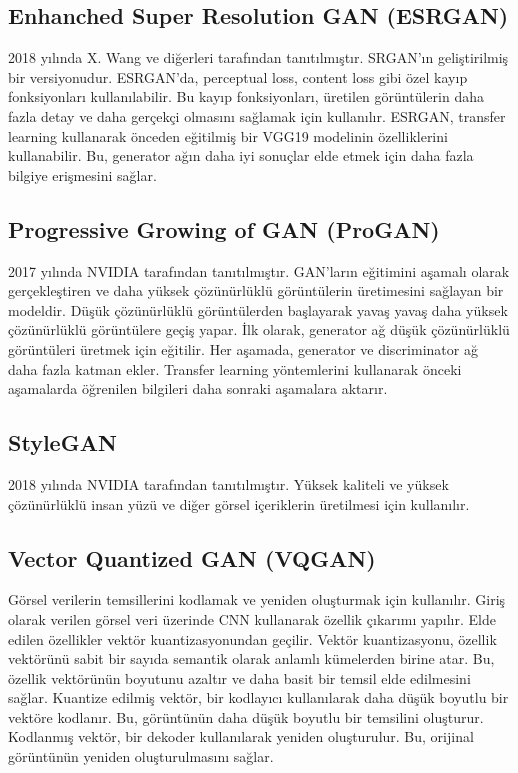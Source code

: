 \subsection{Enhanched Super Resolution GAN (ESRGAN)}
2018 yılında X. Wang ve diğerleri tarafından tanıtılmıştır. SRGAN'ın geliştirilmiş bir versiyonudur. ESRGAN'da, perceptual loss, content loss gibi özel kayıp fonksiyonları kullanılabilir. Bu kayıp fonksiyonları, üretilen görüntülerin daha fazla detay ve daha gerçekçi olmasını sağlamak için kullanılır. ESRGAN, transfer learning kullanarak önceden eğitilmiş bir VGG19 modelinin özelliklerini kullanabilir. Bu, generator ağın daha iyi sonuçlar elde etmek için daha fazla bilgiye erişmesini sağlar.

\subsection{Progressive Growing of GAN (ProGAN)}
2017 yılında NVIDIA tarafından tanıtılmıştır. GAN'ların eğitimini aşamalı olarak gerçekleştiren ve daha yüksek çözünürlüklü görüntülerin üretimesini sağlayan bir modeldir. Düşük çözünürlüklü görüntülerden başlayarak yavaş yavaş daha yüksek çözünürlüklü görüntülere geçiş yapar. İlk olarak, generator ağ düşük çözünürlüklü görüntüleri üretmek için eğitilir. Her aşamada, generator ve discriminator ağ daha fazla katman ekler. Transfer learning yöntemlerini kullanarak önceki aşamalarda öğrenilen bilgileri daha sonraki aşamalara aktarır.

\subsection{StyleGAN}
2018 yılında NVIDIA tarafından tanıtılmıştır. Yüksek kaliteli ve yüksek çözünürlüklü insan yüzü ve diğer görsel içeriklerin üretilmesi için kullanılır.

\subsection{Vector Quantized GAN (VQGAN)}
Görsel verilerin temsillerini kodlamak ve yeniden oluşturmak için kullanılır. Giriş olarak verilen görsel veri üzerinde CNN kullanarak özellik çıkarımı yapılır. Elde edilen özellikler vektör kuantizasyonundan geçilir. Vektör kuantizasyonu, özellik vektörünü sabit bir sayıda semantik olarak anlamlı kümelerden birine atar. Bu, özellik vektörünün boyutunu azaltır ve daha basit bir temsil elde edilmesini sağlar. Kuantize edilmiş vektör, bir kodlayıcı kullanılarak daha düşük boyutlu bir vektöre kodlanır. Bu, görüntünün daha düşük boyutlu bir temsilini oluşturur. Kodlanmış vektör, bir dekoder kullanılarak yeniden oluşturulur. Bu, orijinal görüntünün yeniden oluşturulmasını sağlar. 


